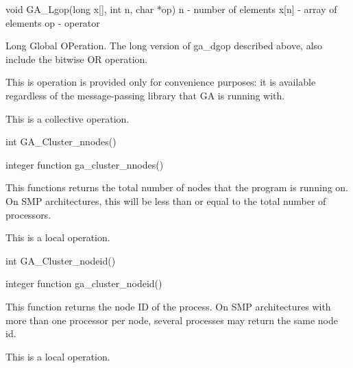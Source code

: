\documentclass[12pt]{article}
\begin{document}

\begin{capi}
void GA_Lgop(long x[], int n, char *op)
   n     - number of elements       \access{[input]} 
   x[n]  - array of elements         
   op    - operator                 \access{[input]} 
\end{capi}

\begin{desc}

Long Global OPeration. The long version of ga_dgop described above, also include the bitwise OR operation.

This is operation is provided only for convenience purposes: it is available regardless of the message-passing library that GA is running with.

This is a collective operation.
\end{desc}


\begin{capi}
int GA_Cluster_nnodes()
\end{capi}
\begin{fapi}
integer function ga_cluster_nnodes()
\end{fapi}

\begin{desc}


This functions returns the total number of nodes that the program is running on. On SMP architectures, this will be less than or equal to the total number of processors.

This is a  local operation.
\end{desc}


\begin{capi}
int GA_Cluster_nodeid()
\end{capi}
\begin{fapi}
integer function ga_cluster_nodeid()
\end{fapi}

\begin{desc}

This function returns the node ID of the process.  On SMP architectures with more than one processor per node, several processes may return the same node id.

This is a  local operation.
\end{desc}

\end{document}
